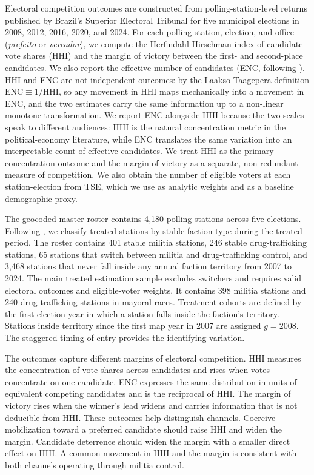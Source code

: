 \documentclass[11pt]{article}
\begin{document}
Electoral competition outcomes are constructed from polling-station-level returns published by Brazil's Superior Electoral Tribunal \citep{tse2024} for five municipal elections in 2008, 2012, 2016, 2020, and 2024. For each polling station, election, and office (\emph{prefeito} or \emph{vereador}), we compute the Herfindahl-Hirschman index of candidate vote shares (HHI) and the margin of victory between the first- and second-place candidates. We also report the effective number of candidates (ENC, following \citealt{laakso1979}). HHI and ENC are not independent outcomes: by the Laakso-Taagepera definition $\text{ENC}\equiv 1/\text{HHI}$, so any movement in HHI maps mechanically into a movement in ENC, and the two estimates carry the same information up to a non-linear monotone transformation. We report ENC alongside HHI because the two scales speak to different audiences: HHI is the natural concentration metric in the political-economy literature, while ENC translates the same variation into an interpretable count of effective candidates. We treat HHI as the primary concentration outcome and the margin of victory as a separate, non-redundant measure of competition. We also obtain the number of eligible voters at each station-election from TSE, which we use as analytic weights and as a baseline demographic proxy.

The geocoded master roster contains 4,180 polling stations across five elections. Following \citet{monteiro2023enterprises}, we classify treated stations by stable faction type during the treated period. The roster contains 401 stable militia stations, 246 stable drug-trafficking stations, 65 stations that switch between militia and drug-trafficking control, and 3,468 stations that never fall inside any annual faction territory from 2007 to 2024. The main treated estimation sample excludes switchers and requires valid electoral outcomes and eligible-voter weights. It contains 398 militia stations and 240 drug-trafficking stations in mayoral races. Treatment cohorts are defined by the first election year in which a station falls inside the faction's territory. Stations inside territory since the first map year in 2007 are assigned $g = 2008$. The staggered timing of entry provides the identifying variation.

The outcomes capture different margins of electoral competition. HHI measures the concentration of vote shares across candidates and rises when votes concentrate on one candidate. ENC expresses the same distribution in units of equivalent competing candidates and is the reciprocal of HHI. The margin of victory rises when the winner's lead widens and carries information that is not deducible from HHI. These outcomes help distinguish channels. Coercive mobilization toward a preferred candidate should raise HHI and widen the margin. Candidate deterrence should widen the margin with a smaller direct effect on HHI. A common movement in HHI and the margin is consistent with both channels operating through militia control.
\end{document}
